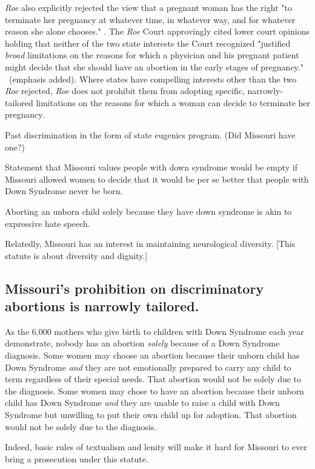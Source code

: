 \documentclass[12pt,\documentclassflag]{SCOTUS_Brief}
\begin{document}
\textit{Roe} also explicitly rejected the view that a pregnant woman has the right "to terminate her pregnancy at whatever time, in whatever way, and for whatever reason she alone chooses." . The \textit{Roe} Court approvingly cited lower court opinions holding that neither of the two state interests the Court recognized "justified \textit{broad} limitations on the reasons for which a physician and his pregnant patient might decide that she should have an abortion in the early stages of pregnancy." ~(emphasis added). Where states have compelling interests other than the two \textit{Roe} rejected, \textit{Roe} does not prohibit them from adopting specific, narrowly-tailored limitations on the reasons for which a woman can decide to terminate her pregnancy.

Past discrimination in the form of state eugenics program. (Did Missouri have one?)

Statement that Missouri values people with down syndrome would be empty if Missouri allowed women to decide that it would be per se better that people with Down Syndrome never be born.

Aborting an unborn child solely because they have down syndrome is akin to expressive hate speech.

Relatedly, Missouri has an interest in maintaining neurological diversity. [This statute is about diversity and dignity.]

\subsection{Missouri's prohibition on discriminatory abortions is narrowly tailored.}

As the 6,000 mothers who give birth to children with Down Syndrome each year demonstrate, nobody has an abortion \textit{solely} because of a Down Syndrome diagnosis. Some women may choose an abortion because their unborn child has Down Syndrome \textit{and} they are not emotionally prepared to carry any child to term regardless of their special needs. That abortion would not be solely due to the diagnosis. Some women may chose to have an abortion because their unborn child has Down Syndrome \textit{and} they are unable to raise a child with Down Syndrome but unwilling to put their own child up for adoption. That abortion would not be solely due to the diagnosis.

Indeed, basic rules of textualism and lenity will make it hard for Missouri to ever bring a prosecution under this statute.
\end{document}
